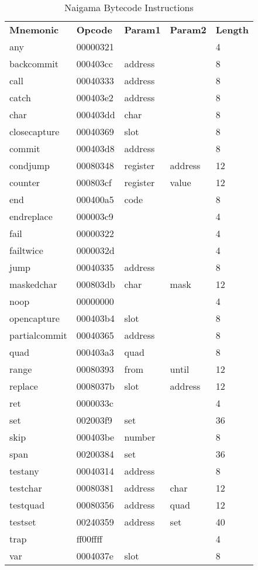
\begin{table}[]
\centering
\caption{Naigama Bytecode Instructions}
\label{tab:naig_bytecode}
\begin{tabular}{lllll}
\textbf{Mnemonic} & \textbf{Opcode} & \textbf{Param1} & \textbf{Param2} & \textbf{Length} \\
any & 00000321 &  &   & 4 \\
backcommit & 000403cc & address &   & 8 \\
call & 00040333 & address &   & 8 \\
catch & 000403e2 & address &   & 8 \\
char & 000403dd & char &   & 8 \\
closecapture & 00040369 & slot &   & 8 \\
commit & 000403d8 & address &   & 8 \\
condjump & 00080348 & register & address  & 12 \\
counter & 000803cf & register & value  & 12 \\
end & 000400a5 & code &   & 8 \\
endreplace & 000003c9 &  &   & 4 \\
fail & 00000322 &  &   & 4 \\
failtwice & 0000032d &  &   & 4 \\
jump & 00040335 & address &   & 8 \\
maskedchar & 000803db & char & mask  & 12 \\
noop & 00000000 &  &   & 4 \\
opencapture & 000403b4 & slot &   & 8 \\
partialcommit & 00040365 & address &   & 8 \\
quad & 000403a3 & quad &   & 8 \\
range & 00080393 & from & until  & 12 \\
replace & 0008037b & slot & address  & 12 \\
ret & 0000033c &  &   & 4 \\
set & 002003f9 & set &   & 36 \\
skip & 000403be & number &   & 8 \\
span & 00200384 & set &   & 36 \\
testany & 00040314 & address &   & 8 \\
testchar & 00080381 & address & char  & 12 \\
testquad & 00080356 & address & quad  & 12 \\
testset & 00240359 & address & set  & 40 \\
trap & ff00ffff &  &   & 4 \\
var & 0004037e & slot &   & 8 \\
\end{tabular}
\end{table}
